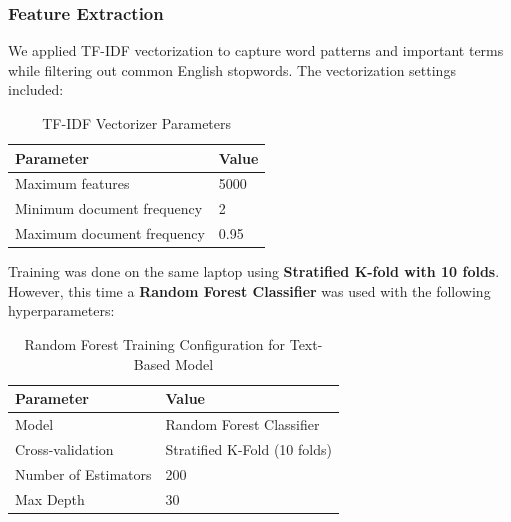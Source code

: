 \documentclass{article}
\begin{document}
\subsubsection*{Feature Extraction}

We applied TF-IDF vectorization to capture word patterns and important terms while filtering out common English stopwords. The vectorization settings included:

\begin{table}[H]
\renewcommand{\arraystretch}{1.3}
\setlength{\tabcolsep}{11pt}
\centering
\begin{tabular}{|p{6cm}|p{8.5cm}|}
\hline
\textbf{Parameter} & \textbf{Value} \\
\hline
Maximum features & 5000 \\
\hline
Minimum document frequency & 2 \\
\hline
Maximum document frequency & 0.95 \\
\hline
\end{tabular}
\caption{TF-IDF Vectorizer Parameters}
\label{tab:tfidf_params}
\end{table}

\noindent
Training was done on the same laptop using \textbf{Stratified K-fold with 10 folds}. However, this time a \textbf{Random Forest Classifier} was used with the following hyperparameters:


\begin{table}[h!]
    \centering
    \renewcommand{\arraystretch}{1.2}
    \setlength{\tabcolsep}{11pt}
    \begin{tabular}{|l|l|}
        \hline
        \textbf{Parameter} & \textbf{Value} \\
        \hline
        Model & Random Forest Classifier \\
        \hline
        Cross-validation & Stratified K-Fold (10 folds) \\
        \hline
        Number of Estimators & 200 \\
        \hline
        Max Depth & 30 \\
        \hline
    \end{tabular}
    \caption{Random Forest Training Configuration for Text-Based Model}
\end{table}
\end{document}
